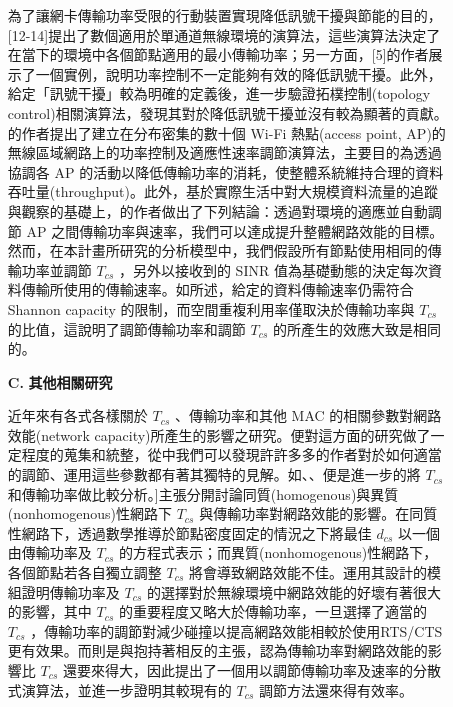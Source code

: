 \documentclass[12pt,a4paper]{article}
\begin{document}
\begin{description}
\begin{enumerate}
為了讓網卡傳輸功率受限的行動裝置實現降低訊號干擾與節能的目的，[12-14]提出了數個適用於單通道無線環境的演算法，這些演算法決定了在當下的環境中各個節點適用的最小傳輸功率；另一方面，[5]的作者展示了一個實例，說明功率控制不一定能夠有效的降低訊號干擾。此外，給定「訊號干擾」較為明確的定義後，進一步驗證拓樸控制(topology control)相關演算法，發現其對於降低訊號干擾並沒有較為顯著的貢獻。\cite{acm2005_smcwd}的作者提出了建立在分布密集的數十個 Wi-Fi 熱點(access point, AP)的無線區域網路上的功率控制及適應性速率調節演算法，主要目的為透過協調各 AP 的活動以降低傳輸功率的消耗，使整體系統維持合理的資料吞吐量(throughput)。此外，基於實際生活中對大規模資料流量的追蹤與觀察的基礎上，\cite{acm2005_smcwd}的作者做出了下列結論：透過對環境的適應並自動調節 AP 之間傳輸功率與速率，我們可以達成提升整體網路效能的目標。 然而，在本計畫所研究的分析模型中，我們假設所有節點使用相同的傳輸功率並調節 $T_{cs}$ ，另外以接收到的 SINR 值為基礎動態的決定每次資料傳輸所使用的傳輸速率。如\cite{mobicom06_kim}所述，給定的資料傳輸速率仍需符合 Shannon capacity 的限制，而空間重複利用率僅取決於傳輸功率與 $T_{cs}$ 的比值，這說明了調節傳輸功率和調節 $T_{cs}$ 的所產生的效應大致是相同的。 \\


\item [\bf C.]{\textbf{\Kai 其他相關研究 }}\\
\vspace{-2mm}

近年來有各式各樣關於 $T_{cs}$ 、傳輸功率和其他 MAC 的相關參數對網路效能(network capacity)所產生的影響之研究。\cite{cst14_survey}便對這方面的研究做了一定程度的蒐集和統整，從中我們可以發現許許多多的作者對於如何適當的調節、運用這些參數都有著其獨特的見解。如\cite{adhoc11_park}、\cite{tmc08_hou}、\cite{tvt09_power}便是進一步的將 $T_{cs}$ 和傳輸功率做比較分析。\cite{adhoc11_park}]主張分開討論同質(homogenous)與異質(nonhomogenous)性網路下 $T_{cs}$ 與傳輸功率對網路效能的影響。在同質性網路下，透過數學推導於節點密度固定的情況之下將最佳 $d_{cs}$ 以一個由傳輸功率及 $T_{cs}$ 的方程式表示；而異質(nonhomogenous)性網路下，各個節點若各自獨立調整 $T_{cs}$ 將會導致網路效能不佳。\cite{tvt09_power}運用其設計的模組證明傳輸功率及 $T_{cs}$ 的選擇對於無線環境中網路效能的好壞有著很大的影響，其中 $T_{cs}$ 的重要程度又略大於傳輸功率，一旦選擇了適當的 $T_{cs}$ ，傳輸功率的調節對減少碰撞以提高網路效能相較於使用RTS/CTS 更有效果。而\cite{tmc08_hou}則是與\cite{tvt09_power}抱持著相反的主張，認為傳輸功率對網路效能的影響比 $T_{cs}$ 還要來得大，因此提出了一個用以調節傳輸功率及速率的分散式演算法，並進一步證明其較現有的 $T_{cs}$ 調節方法還來得有效率。 


\end{enumerate}
\end{description}
\end{document}
